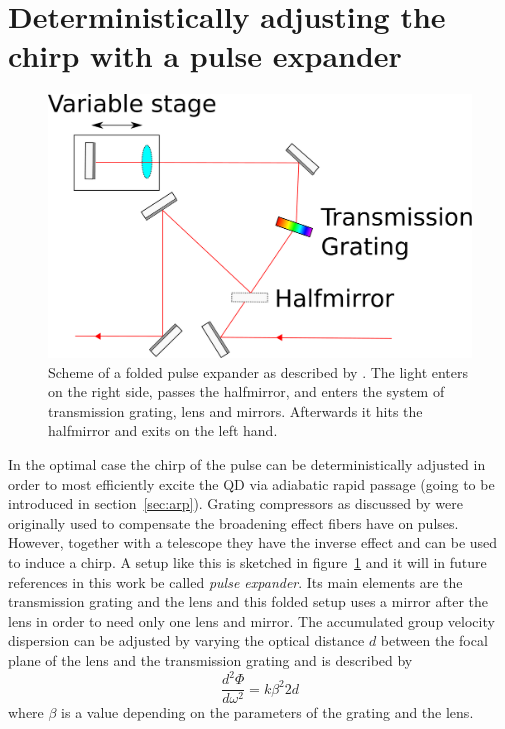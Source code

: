 \section{Deterministically adjusting the chirp with a pulse expander}
\label{sec:pulse-expander}
\begin{figure}[H]
	\centering
	\includegraphics[width=0.7\linewidth]{figures/chirp/pulse-expander}
	\caption{Scheme of a folded pulse expander as described by \textcite{martinez_3000_1987}.
		The light enters on the right side, passes the halfmirror, and enters the system of transmission grating, lens and mirrors.
		Afterwards it hits the halfmirror and exits on the left hand.}
	\label{fig:pulse-expander}
\end{figure}



In the optimal case the chirp of the pulse can be deterministically adjusted in order to most efficiently excite the \ac{QD} via adiabatic rapid passage (going to be introduced in section~\ref{sec:arp}).
Grating compressors as discussed by \textcite{martinez_3000_1987} were originally used to compensate the broadening effect fibers have on pulses.
However, together with a telescope they have the inverse effect and can be used to induce a chirp.
A setup like this is sketched in figure~\ref{fig:pulse-expander} and it will in future references in this work be called \textit{pulse expander}.
Its main elements are the transmission grating and the lens and this folded setup uses a mirror after the lens in order to need only one lens and mirror.
The accumulated group velocity dispersion can be adjusted by varying the optical distance $d$ between the focal plane of the lens and the transmission grating and is described by
\begin{equation}
\frac{d^2 \Phi}{d \omega^2} = k \beta^2 2 d
\end{equation}
where $\beta$ is a value depending on the parameters of the grating and the lens.

